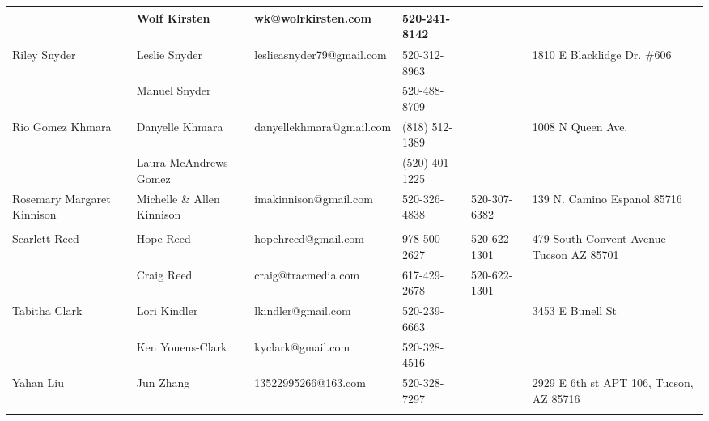 \documentclass[landscape]{article}\usepackage[]{graphicx}\usepackage[]{color}
\begin{document}
\begin{longtable}{|p{100pt}|p{100pt}|p{140pt}|p{60pt}|p{64pt}|p{120pt}|}
 & Wolf Kirsten & wk@wolrkirsten.com & 520-241-8142 &  & \\
\hline
\multirow{2}{100pt}{Riley Snyder} & Leslie Snyder & leslieasnyder79@gmail.com & 520-312-8963 &  & \multirow{2}{120pt}{1810 E Blacklidge Dr. \#606} \\
 & Manuel Snyder &  & 520-488-8709 &  & \\
\hline
\multirow{2}{100pt}{Rio Gomez Khmara} & Danyelle Khmara & danyellekhmara@gmail.com & (818) 512-1389 &  & \multirow{2}{120pt}{1008 N Queen Ave.} \\
 & Laura McAndrews Gomez &  & (520) 401-1225 &  & \\
\hline
\multirow{2}{100pt}{Rosemary Margaret Kinnison} & Michelle \& Allen Kinnison & imakinnison@gmail.com & 520-326-4838 & 520-307-6382 & \multirow{2}{120pt}{139 N. Camino Espanol 85716} \\
 &  &  &  &  & \\
\hline
\multirow{2}{100pt}{Scarlett Reed} & Hope Reed & hopehreed@gmail.com & 978-500-2627 & 520-622-1301 & \multirow{2}{120pt}{479 South Convent Avenue Tucson AZ  85701} \\
 & Craig Reed & craig@tracmedia.com & 617-429-2678 & 520-622-1301 & \\
\hline
\multirow{2}{100pt}{Tabitha Clark} & Lori Kindler & lkindler@gmail.com & 520-239-6663 &  & \multirow{2}{120pt}{3453 E Bunell St} \\
 & Ken Youens-Clark & kyclark@gmail.com & 520-328-4516 &  & \\
\hline
\multirow{2}{100pt}{Yahan Liu} & Jun Zhang & 13522995266@163.com & 520-328-7297 &  & \multirow{2}{120pt}{2929 E 6th st APT 106, Tucson, AZ 85716} \\
 &  &  &  &  & \\
\hline
\end{longtable}
\newpage

\hline
\end{document}
